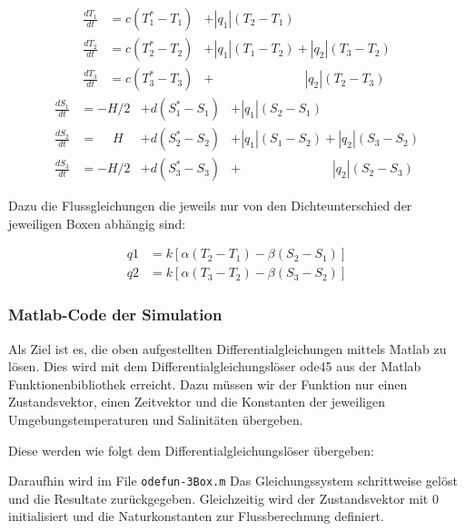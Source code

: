 \begin{equation}
\begin{aligned}
\frac{dT_1}{dt} &= c(T_1^*-T_1)&+|q_1|(T_2-T_1)\phantom{+|q_2|(T_3-T_2)}
\\
\frac{dT_2}{dt} &= c(T_2^*-T_2)&+|q_1|(T_1-T_2)+|q_2|(T_3-T_2)
\\
\frac{dT_3}{dt} &= c(T_3^*-T_3)&+ \phantom{+|q_1|(T_1-T_2)}|q_2|(T_2-T_3)
\end{aligned}
\end{equation}
\begin{equation}
\begin{aligned}
\frac{dS_1}{dt} &= -H/2 &+ d(S_1^*-S_1)&+|q_1|(S_2-S_1)\phantom{+|q_2|(S_3-S_2)}
\\
\frac{dS_2}{dt} &= \phantom{-}H &+ d(S_2^*-S_2)&+|q_1|(S_1-S_2)+|q_2|(S_3-S_2)	
\\
\frac{dS_3}{dt} &= -H/2 &+d(S_3^*-S_3)&+ \phantom{+|q_1|(S_1-S_2)}|q_2|(S_2-S_3)
\end{aligned}
\end{equation}	

Dazu die Flussgleichungen die jeweils nur von den Dichteunterschied der jeweiligen Boxen abhängig sind:

\begin{equation}
\begin{aligned}
 q1 &= k[\alpha(T_2-T_1)-\beta(S_2-S_1)] 
 \\
 q2 &= k[\alpha(T_3-T_2)-\beta(S_3-S_2)]
\end{aligned}
\end{equation}

\subsubsection{Matlab-Code der Simulation}

Als Ziel ist es, die oben aufgestellten Differentialgleichungen mittels Matlab zu lösen. Dies wird mit dem Differentialgleichungslöser ode45 aus der Matlab Funktionenbibliothek erreicht.
Dazu müssen wir der Funktion nur einen Zustandsvektor, einen Zeitvektor und die Konstanten der jeweiligen Umgebungstemperaturen und Salinitäten übergeben.
 
Diese werden wie folgt dem Differentialgleichungslöser übergeben:
 

Daraufhin wird im File \texttt{odefun-3Box.m} Das Gleichungssystem schrittweise gelöst und die Resultate zurückgegeben. Gleichzeitig wird der Zustandsvektor mit $0$ initialisiert und die Naturkonstanten zur Flussberechnung definiert.

